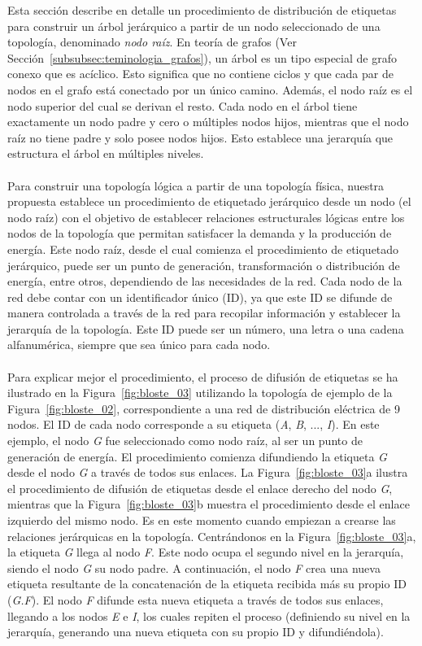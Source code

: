 Esta sección describe en detalle un procedimiento de distribución de etiquetas para construir un árbol jerárquico a partir de un nodo seleccionado de una topología, denominado \textit{nodo raíz}. En teoría de grafos (Ver Sección~\ref{subsubsec:teminologia_grafos}), un árbol es un tipo especial de grafo conexo que es acíclico. Esto significa que no contiene ciclos y que cada par de nodos en el grafo está conectado por un único camino. Además, el nodo raíz es el nodo superior del cual se derivan el resto. Cada nodo en el árbol tiene exactamente un nodo padre y cero o múltiples nodos hijos, mientras que el nodo raíz no tiene padre y solo posee nodos hijos. Esto establece una jerarquía que estructura el árbol en múltiples niveles.\\
\\
Para construir una topología lógica a partir de una topología física, nuestra propuesta establece un procedimiento de etiquetado jerárquico desde un nodo (el nodo raíz) con el objetivo de establecer relaciones estructurales lógicas entre los nodos de la topología que permitan satisfacer la demanda y la producción de energía. Este nodo raíz, desde el cual comienza el procedimiento de etiquetado jerárquico, puede ser un punto de generación, transformación o distribución de energía, entre otros, dependiendo de las necesidades de la red. Cada nodo de la red debe contar con un identificador único (ID), ya que este ID se difunde de manera controlada a través de la red para recopilar información y establecer la jerarquía de la topología. Este ID puede ser un número, una letra o una cadena alfanumérica, siempre que sea único para cada nodo.\\
\\
Para explicar mejor el procedimiento, el proceso de difusión de etiquetas se ha ilustrado en la Figura~\ref{fig:bloste_03} utilizando la topología de ejemplo de la Figura~\ref{fig:bloste_02}, correspondiente a una red de distribución eléctrica de 9 nodos. El ID de cada nodo corresponde a su etiqueta (\textit{A}, \textit{B}, ..., \textit{I}). En este ejemplo, el nodo \textit{G} fue seleccionado como nodo raíz, al ser un punto de generación de energía. El procedimiento comienza difundiendo la etiqueta \textit{G} desde el nodo \textit{G} a través de todos sus enlaces. La Figura~\ref{fig:bloste_03}a ilustra el procedimiento de difusión de etiquetas desde el enlace derecho del nodo \textit{G}, mientras que la Figura~\ref{fig:bloste_03}b muestra el procedimiento desde el enlace izquierdo del mismo nodo. Es en este momento cuando empiezan a crearse las relaciones jerárquicas en la topología. Centrándonos en la Figura~\ref{fig:bloste_03}a, la etiqueta \textit{G} llega al nodo \textit{F}. Este nodo ocupa el segundo nivel en la jerarquía, siendo el nodo \textit{G} su nodo padre. A continuación, el nodo \textit{F} crea una nueva etiqueta resultante de la concatenación de la etiqueta recibida más su propio ID (\textit{G.F}). El nodo \textit{F} difunde esta nueva etiqueta a través de todos sus enlaces, llegando a los nodos \textit{E} e \textit{I}, los cuales repiten el proceso (definiendo su nivel en la jerarquía, generando una nueva etiqueta con su propio ID y difundiéndola). 


